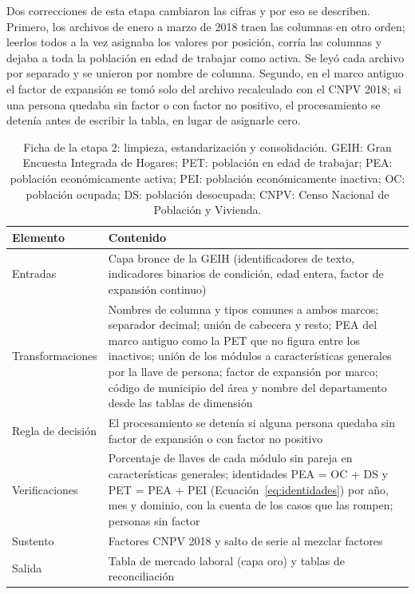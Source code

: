 Dos correcciones de esta etapa cambiaron las cifras y por eso se describen. Primero, los archivos de enero a marzo de 2018 traen las columnas en otro orden; leerlos todos a la vez asignaba los valores por posición, corría las columnas y dejaba a toda la población en edad de trabajar como activa. Se leyó cada archivo por separado y se unieron por nombre de columna. Segundo, en el marco antiguo el factor de expansión se tomó solo del archivo recalculado con el CNPV 2018; si una persona quedaba sin factor o con factor no positivo, el procesamiento se detenía antes de escribir la tabla, en lugar de asignarle cero.

\begin{table}[!htbp]
\centering
\small
\caption[Ficha de la etapa 2: limpieza, estandarización y consolidación]{Ficha de la etapa 2: limpieza, estandarización y consolidación. GEIH: Gran Encuesta Integrada de Hogares; PET: población en edad de trabajar; PEA: población económicamente activa; PEI: población económicamente inactiva; OC: población ocupada; DS: población desocupada; CNPV: Censo Nacional de Población y Vivienda.}
\label{tab:met_limpieza}
\renewcommand{\arraystretch}{1.15}
\begin{tabularx}{\linewidth}{>{\raggedright\arraybackslash}p{2.8cm} >{\raggedright\arraybackslash}X}
\toprule
Elemento & Contenido \\
\midrule
Entradas & Capa bronce de la GEIH (identificadores de texto, indicadores binarios de condición, edad entera, factor de expansión continuo) \\
Transformaciones & Nombres de columna y tipos comunes a ambos marcos; separador decimal; unión de cabecera y resto; PEA del marco antiguo como la PET que no figura entre los inactivos; unión de los módulos a características generales por la llave de persona; factor de expansión por marco; código de municipio del área y nombre del departamento desde las tablas de dimensión \\
Regla de decisión & El procesamiento se detenía si alguna persona quedaba sin factor de expansión o con factor no positivo \\
Verificaciones & Porcentaje de llaves de cada módulo sin pareja en características generales; identidades PEA = OC + DS y PET = PEA + PEI (Ecuación~\ref{eq:identidades}) por año, mes y dominio, con la cuenta de los casos que las rompen; personas sin factor \\
Sustento & Factores CNPV 2018 y salto de serie al mezclar factores \cite[pp.~3, 19]{DANE_GEIH_Series2022} \\
Salida & Tabla de mercado laboral (capa oro) y tablas de reconciliación \\
\bottomrule
\end{tabularx}
\end{table}

